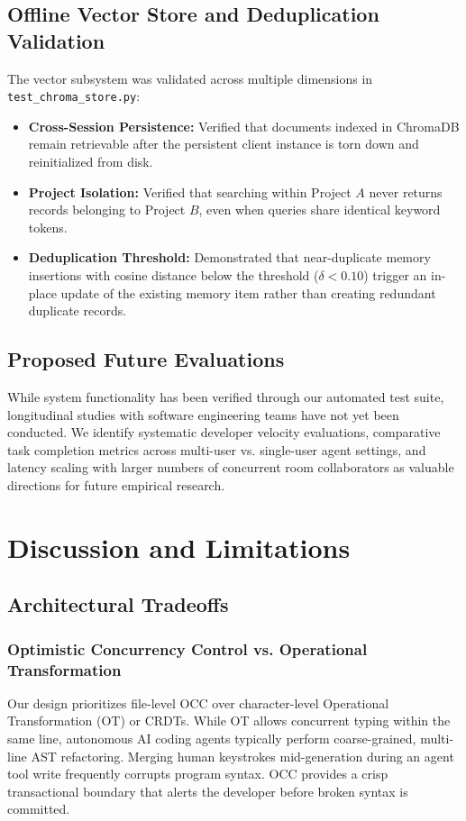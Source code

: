 \documentclass[conference]{IEEEtran}
\begin{document}
\subsection{Offline Vector Store and Deduplication Validation}
The vector subsystem was validated across multiple dimensions in \texttt{test\_chroma\_store.py}:
\begin{itemize}
    \item \textbf{Cross-Session Persistence:} Verified that documents indexed in ChromaDB remain retrievable after the persistent client instance is torn down and reinitialized from disk.
    \item \textbf{Project Isolation:} Verified that searching within Project $A$ never returns records belonging to Project $B$, even when queries share identical keyword tokens.
    \item \textbf{Deduplication Threshold:} Demonstrated that near-duplicate memory insertions with cosine distance below the threshold ($\delta < 0.10$) trigger an in-place update of the existing memory item rather than creating redundant duplicate records.
\end{itemize}

\subsection{Proposed Future Evaluations}
While system functionality has been verified through our automated test suite, longitudinal studies with software engineering teams have not yet been conducted. We identify systematic developer velocity evaluations, comparative task completion metrics across multi-user vs. single-user agent settings, and latency scaling with larger numbers of concurrent room collaborators as valuable directions for future empirical research.

\section{Discussion and Limitations}

\subsection{Architectural Tradeoffs}
\subsubsection{Optimistic Concurrency Control vs. Operational Transformation}
Our design prioritizes file-level OCC over character-level Operational Transformation (OT) or CRDTs. While OT allows concurrent typing within the same line, autonomous AI coding agents typically perform coarse-grained, multi-line AST refactoring. Merging human keystrokes mid-generation during an agent tool write frequently corrupts program syntax. OCC provides a crisp transactional boundary that alerts the developer before broken syntax is committed.
\end{document}
